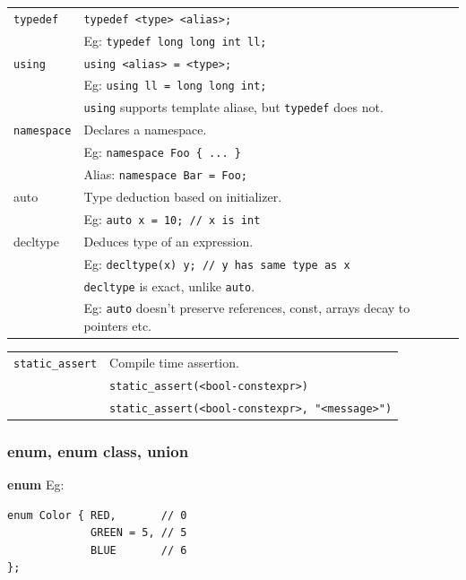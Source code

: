 \begin{tabularx}{\linewidth}{lX}
    \texttt{typedef}        & \texttt{typedef <type> <alias>;}\\
                            & Eg: \texttt{typedef long long int ll;}\\
    \texttt{using}          & \texttt{using <alias> = <type>;}\\
                            & Eg: \texttt{using ll = long long int;}\\
                            & \texttt{using} supports template aliase, but \texttt{typedef} does not.\\
    \texttt{namespace}      & Declares a namespace.\\
                            & Eg: \texttt{namespace Foo \{ ... \}}\\
                            & Alias: \texttt{namespace Bar = Foo;}\\
    \hline
    auto                   & Type deduction based on initializer.\\
                           & Eg: \texttt{auto x = 10; // x is int}\\
    decltype               & Deduces type of an expression.\\
                           & Eg: \texttt{decltype(x) y; // y has same type as x}\\
                           & \texttt{decltype} is exact, unlike \texttt{auto}.\\
                           & Eg: \texttt{auto} doesn't preserve references, const, arrays decay to pointers etc.\\
    \hline
\end{tabularx}

\begin{tabularx}{\linewidth}{lX}
    \texttt{static\_assert} & Compile time assertion.\\
                            & \texttt{static\_assert(<bool-constexpr>)}\\
                            & \texttt{static\_assert(<bool-constexpr>, "<message>")}\\
    \hline
\end{tabularx}

\subsubsection{enum, enum class, union}

\textbf{enum}
Eg:
\begin{mdframed}[nobreak=true,backgroundcolor=gray!10,linecolor=Firebrick4]
\begin{verbatim}
enum Color { RED,       // 0
             GREEN = 5, // 5
             BLUE       // 6
};
\end{verbatim}
\end{mdframed}

